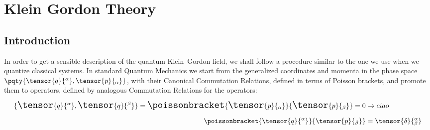 \chapter{Klein Gordon Theory}\label{ch:KG-theory}
        \section{Introduction}
        In order to get a sensible description of the quantum Klein--Gordon field, we shall follow a procedure similar to the one we use when we quantize classical systems. In standard Quantum Mechanics we start from the generalized coordinates and momenta in the phase space $\pqty{\tensor{q}{^\alpha}, \tensor{p}{_\alpha}}$, with their Canonical Commutation Relations, defined in terms of Poisson brackets, and promote them to operators, defined by analogous Commutation Relations for the operators:
        \begin{align*}
                \Large\{\tensor{q}{^\alpha},\tensor{q}{^\beta}\Large\} = \poissonbracket{\tensor{p}{_\alpha}}{\tensor{p}{_\beta}} = 0 & \rightarrow ciao\\
                \poissonbracket{\tensor{q}{^\alpha}}{\tensor{p}{_\beta}} &= \tensor{\delta}{^\alpha_\beta}
        \end{align*}
